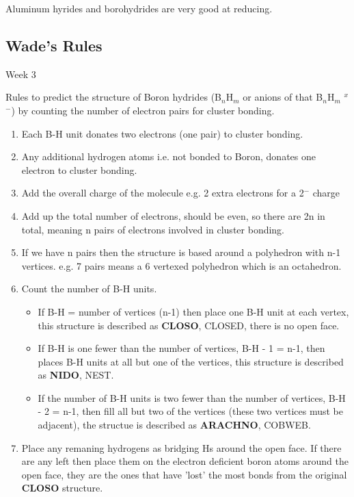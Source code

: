 \documentclass{article}
\renewcommand{\sup}[1]{\(^#1\)}
\newcommand{\sub}[1]{\(_#1\)}
\newcommand{\thedate}[1]{\hfill{\small\sc #1}}
\begin{document}
    Aluminum hyrides and borohydrides are very good at reducing. 

    \newpage

    \subsection{Wade's Rules}\thedate{Week 3}

    Rules to predict the structure of Boron hydrides (B\sub{n}H\sub{m} or anions of that B\sub{n}H\sub{m} \sup{x}\sup{-})
    by counting the number of electron pairs for cluster bonding.

    \begin{enumerate}
        \item Each B-H unit donates two electrons (one pair) to cluster bonding.
        \item Any additional hydrogen atoms i.e. not bonded to Boron, donates one electron to cluster bonding.
        \item Add the overall charge of the molecule e.g. 2 extra electrons for a 2\sup{-} charge
        \item Add up the total number of electrons, should be even, so there are 2n in total, meaning n pairs of electrons involved in cluster bonding.
        \item If we have n pairs then the structure is based around a polyhedron with n-1 vertices. e.g. 7 pairs means a 6 vertexed polyhedron which is an octahedron.
        \item Count the number of B-H units.
        \begin{itemize}
            \item If B-H = number of vertices (n-1) then place one B-H unit at each vertex, this structure is described as \textbf{CLOSO}, CLOSED, there is no open face.
            \item If B-H is one fewer than the number of vertices, B-H - 1 = n-1, then places B-H units at all but one of the vertices, this structure is described as \textbf{NIDO}, NEST.
            \item If the number of B-H units is two fewer than the number of vertices, B-H - 2 = n-1, then fill all but two of the vertices (these two vertices must be adjacent), the structue is described as \textbf{ARACHNO}, COBWEB.
        \end{itemize}
        \item Place any remaning hydrogens as bridging Hs around the open face. If there are any left then place them on the electron deficient boron atoms around the open face, they are the ones that have 'lost' the most bonds from the original \textbf{CLOSO} structure.
    \end{enumerate}
    
\end{document}
